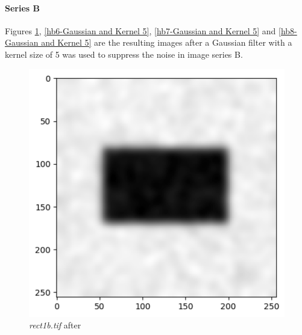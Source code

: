 \documentclass[runningheads]{llncs}
\begin{document}
\paragraph*{\textbf{Series B}}
Figures \ref{hb5-Gaussian and Kernel 5}, \ref{hb6-Gaussian and Kernel 5}, \ref{hb7-Gaussian and Kernel 5} and \ref{hb8-Gaussian and Kernel 5} are the resulting images after a Gaussian filter with a kernel size of 5 was used to suppress the noise in image series B. 
\begin{figure}[h!]
\begin{minipage}[h]{0.47\linewidth}
\begin{center}
\includegraphics[width=1\linewidth]{Report/Result_Images/image_hb5.png} 
\caption{\emph{rect1b.tif} after}
\label{hb5-Gaussian and Kernel 5}
\end{center} 
\end{minipage}
\hfill
\vspace{0.2 cm}
\begin{minipage}[h]{0.47\linewidth}
\begin{center}

\end{center}
\end{minipage}
\end{figure}
\end{document}
